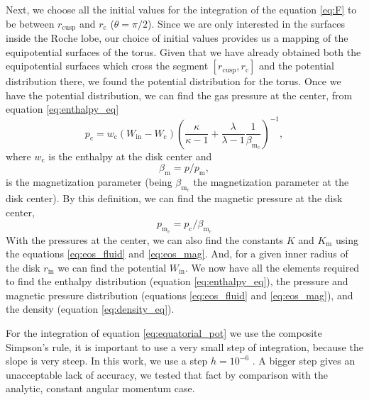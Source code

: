 \documentclass{aa}
\begin{document}
Next, we choose all the initial values for the integration of the equation \eqref{eq:F} to be between $r_{\mathrm{cusp}}$ and $r_{\mathrm{c}}$ ($\theta = \pi / 2$). Since we are only interested in the surfaces inside the Roche lobe, our choice of initial values provides us a mapping of the equipotential surfaces of the torus. Given that we have already obtained both the equipotential surfaces which cross the segment $[r_{\mathrm{cusp}}, r_{\mathrm{c}}]$ and the potential distribution there, we found the potential distribution for the torus.
Once we have the potential distribution, we can find the gas pressure at the center, from equation \eqref{eq:enthalpy_eq}
\begin{equation}
p_{\mathrm{c}} = w_{\mathrm{c}}(W_{\mathrm{in}} - W_{\mathrm{c}})\left(\frac{\kappa}{\kappa - 1} + \frac{\lambda
}{\lambda
 - 1}\frac{1}{\beta_{\mathrm{m}_{\mathrm{c}}}}\right)^{-1},
\end{equation}
where $w_{\mathrm{c}}$ is the enthalpy at the disk center and
\begin{equation}
\label{eq:beta_eq}
\beta_{\mathrm{m}} = p/p_{\mathrm{m}},
\end{equation}
is the magnetization parameter (being $\beta_{\mathrm{m}_{\mathrm{c}}}$ the magnetization parameter at the disk center). By this definition, we can find the magnetic pressure at the disk center,
\begin{equation}
p_{\mathrm{m_{\mathrm{c}}}} = p_{\mathrm{c}}/\beta_{\mathrm{m}_{\mathrm{c}}}
\end{equation}
With the pressures at the center, we can also find the constants $K$ and $K_{\mathrm{m}}$ using the equations \eqref{eq:eos_fluid} and \eqref{eq:eos_mag}. And, for a given inner radius of the disk $r_{\mathrm{in}}$ we can find the potential $W_{\mathrm{in}}$. We now have all the elements required to find the enthalpy distribution (equation \eqref{eq:enthalpy_eq}), the pressure and magnetic pressure distribution (equations \eqref{eq:eos_fluid} and \eqref{eq:eos_mag}), and the density (equation \eqref{eq:density_eq}).

 

For the integration of equation \eqref{eq:equatorial_pot} we use the composite Simpson's rule, it is important to use a very small step of integration, because the slope is very steep. In this work, we use a step $h = 10^{-6}$ . A bigger step gives an unacceptable lack of accuracy, we tested that fact by comparison with the analytic, constant angular momentum case.
\end{document}
